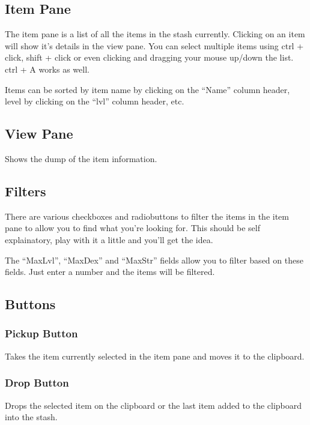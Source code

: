 \documentclass[a4paper,10pt]{article}
\begin{document}
\subsection{Item Pane}

The item pane is a list of all the items in the stash currently. Clicking on an item will show it's details in the view pane. You can select multiple items using ctrl + click, shift + click or even clicking and dragging your mouse up/down the list. ctrl + A works as well.

Items can be sorted by item name by clicking on the ``Name'' column header, level by clicking on the ``lvl'' column header, etc.

\subsection{View Pane}

Shows the dump of the item information.

\subsection{Filters}

There are various checkboxes and radiobuttons to filter the items in the item pane to allow you to find what you're looking for. This should be self explainatory, play with it a little and you'll get the idea.

The ``MaxLvl'', ``MaxDex'' and ``MaxStr'' fields allow you to filter based on these fields. Just enter a number and the items will be filtered.

\subsection{Buttons}

\subsubsection{Pickup Button}

Takes the item currently selected in the item pane and moves it to the clipboard.

\subsubsection{Drop Button}

Drops the selected item on the clipboard or the last item added to the clipboard into the stash.
\end{document}
